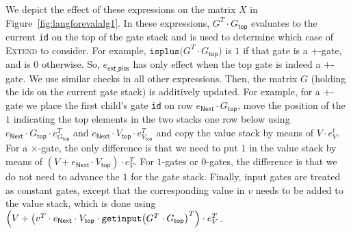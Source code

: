 We depict the effect of these expressions on the matrix $X$ in Figure~\ref{fig:langforevalalg1}. In these expressions, $G^T\cdot G_{\mathsf{top}}$ evaluates to the
current \texttt{id} on the top of the gate stack and is used to determine which case of \textsc{Extend} to consider. For example,
$\texttt{isplus}\bigl(G^T\cdot G_{\mathsf{top}}\bigr)$ is $1$ if that gate is a $+$-gate, and is $0$ otherwise. So,
$e_{\mathsf{ext\_plus}}$ has only effect when the top gate is indeed a $+$-gate. We use similar checks in all other expressions. Then, the matrix $G$ (holding the ids on the current gate stack) is additively updated. For example, for a $+$-gate we place the first child's gate \texttt{id} on row $e_{\mathsf{Next}}\cdot G_{\mathsf{top}}$, move the position of the $1$ indicating the top elements in the two stacks one row below using $e_{\mathsf{Next}}\cdot G_{\mathsf{top}}\cdot e_{G_{\mathsf{top}}}^T$ and $e_{\mathsf{Next}}\cdot V_{\mathsf{top}}\cdot e_{V_{\mathsf{top}}}^T$ and copy the value stack by means of $V\cdot e_V^t$. For a $\times$-gate, the only difference is that we need to put $1$ in the value stack by means of $(V+e_{\mathsf{Next}}\cdot V_{\mathsf{top}})\cdot e_V^T$. For $1$-gates or $0$-gates, the difference is that we do not need to advance the $1$ for the gate stack. Finally, input gates are treated as constant gates, except that the corresponding value in $v$ needs to be added to the value stack, which is done using 
$\Bigl(V + \bigl( v^T \cdot e_{\mathsf{Next}}\cdot V_{\mathsf{top}} \cdot \texttt{getinput}\bigl(G^T\cdot G_{\mathsf{top}}\bigr)^T\Bigr)\cdot e_V^T$.


 

